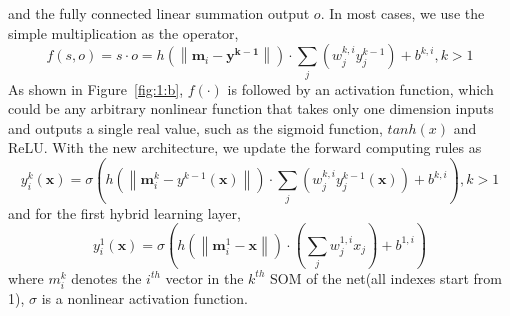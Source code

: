 \documentclass[3p,times,procedia]{elsarticle}
\begin{document}
and the fully connected linear summation 
output $o$. In most cases, we use the
simple multiplication as the operator,
\begin{equation}
	f(s,o) = s\cdot o = 
	h\left(
	\left\|
	\mathbf{m}_i-\mathbf{y^{k-1}}
	\right\|
	\right)
	\cdot
	\sum_j
	\left(
	w_j^{k,i}y_j^{k-1}
	\right)
	+b^{k,i},k>1
	\label{eq:14}
\end{equation}
As shown in Figure~\ref{fig:1:b}, 
$f(\cdot) $ is followed 
by an activation function, which could 
be any 
arbitrary nonlinear function that 
takes 
only one dimension inputs and 
outputs a 
single real value, 
such as the sigmoid function, 
$tanh(x)$ and ReLU. 
With the new 
architecture, 
we update the forward computing
rules as 
\begin{equation}
	y_i^k(\mathbf{x})=
	\sigma\left(
	h\left(
	\left\|
	\mathbf{m}_i^k-y^{k-1}(\mathbf{x})
	\right\|
	\right)\cdot
	\sum_j\left(
	w_j^{k,i}y_j^{k-1}(\mathbf{x})
	\right) + b^{k,i}
	\right), k>1
	\label{eq:15}
\end{equation}
and for the first hybrid learning layer,  
\begin{equation}
	y_i^1(\mathbf{x})=
	\sigma\left(
	h\left(
	\left\|
	\mathbf{m}_i^1-\mathbf{x}
	\right\|
	\right)\cdot
	\left(
	\sum_j w_j^{1,i}x_j
	\right) + b^{1,i}
	\right)
	\label{eq:16}
\end{equation}
where $m^k_i$ denotes the $i^{th}$ vector
in the $k^{th}$ SOM of the net(all indexes
start from 1), $\sigma$ is a nonlinear 
activation function.
\end{document}
